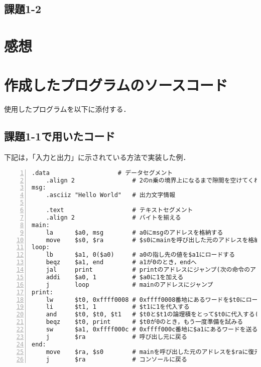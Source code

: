 \subsection{課題1-2}


\section{感想} \label{sec:review}


\section{作成したプログラムのソースコード} \label{sec:makep}

使用したプログラムを以下に添付する．



\subsection{課題1-1で用いたコード} \label{sec:p1-1}
下記は，「入力と出力」に示されている方法で実装した例．
\begin{Verbatim}[numbers=left, xleftmargin=10mm, numbersep=6pt,
                    fontsize=\small, baselinestretch=0.8]
    .data                   # データセグメント
    .align 2                # 2のn乗の境界上になるまで隙間を空けてくれる
msg:
    .asciiz "Hello World"   # 出力文字情報

    .text                   # テキストセグメント
    .align 2                # バイトを揃える
main:
    la      $a0, msg        # a0にmsgのアドレスを格納する
    move    $s0, $ra        # $s0にmainを呼び出した元のアドレスを格納
loop:
    lb      $a1, 0($a0)     # a0の指し先の値を$a1にロードする
    beqz    $a1, end        # a1が0のとき，endへ
    jal     print           # printのアドレスにジャンプ(次の命令のアドレスを$raに)
    addi    $a0, 1          # $a0に1を加える
    j       loop            # mainのアドレスにジャンプ
print:
    lw      $t0, 0xffff0008 # 0xffff0008番地にあるワードを$t0にロードする
    li      $t1, 1          # $t1に1を代入する
    and     $t0, $t0, $t1   # $t0と$t1の論理積をとって$t0に代入する($t0が1か確認する)
    beqz    $t0, print      # $t0が0のとき，もう一度準備を試みる
    sw      $a1, 0xffff000c # 0xffff000c番地に$a1にあるワードを送る
    j       $ra             # 呼び出し元に戻る
end:
    move    $ra, $s0        # mainを呼び出した元のアドレスを$raに復元
    j       $ra             # コンソールに戻る
\end{Verbatim}

